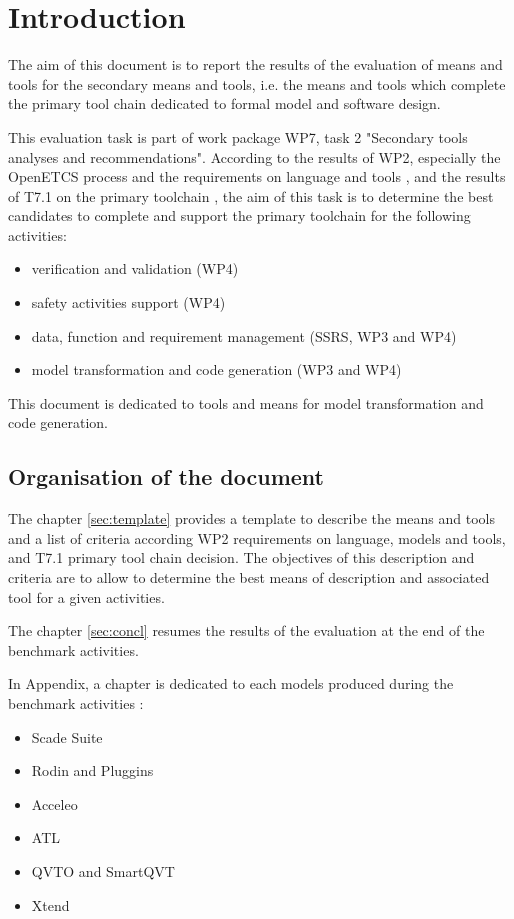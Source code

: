 

\chapter{Introduction}
\label{sec:intro}

The aim of this document is to report the results of the evaluation of means and tools for the secondary means and tools, i.e. the means and tools which complete the primary tool chain dedicated to formal model and software design.

This evaluation task is part of work package WP7, task 2 "Secondary  tools analyses and recommendations". According to the results of WP2, especially the OpenETCS process and the
requirements on language and tools \citep{D2_6}, and the results of T7.1 on the primary toolchain \citep{D7.1},  the aim of this task is to determine the best candidates to complete and support the primary toolchain for the following activities:

\begin{itemize}
\item verification and  validation (WP4)
\item safety activities support (WP4)
\item data, function and requirement management (SSRS, WP3 and WP4)
\item model transformation and code generation (WP3 and WP4)
\end{itemize}

  
This document is dedicated to tools and means for model transformation and code generation.

\section{Organisation of the document}

The chapter  \ref{sec:template} provides a template to describe the means and tools and a list
of criteria according WP2 requirements on language, models and tools, and T7.1 primary tool chain decision. The objectives of this
description and criteria are to allow to determine the best means of description and associated
tool for a given activities.


The chapter \ref{sec:concl} resumes the results of the evaluation at the end of the benchmark activities.

In Appendix, a chapter is dedicated to each models produced during the benchmark activities :

\begin{itemize}
\item Scade Suite
\item Rodin and Pluggins
\item Acceleo
\item ATL
\item QVTO and SmartQVT
\item Xtend
\end{itemize}



